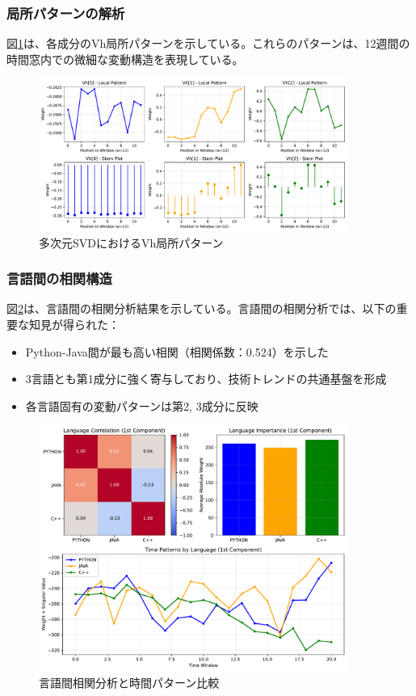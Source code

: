 \documentclass[a4paper,11pt]{jsarticle}
\begin{document}
\subsubsection{局所パターンの解析}

図\ref{fig:multilang-vh-patterns}は、各成分のVh局所パターンを示している。これらのパターンは、12週間の時間窓内での微細な変動構造を表現している。

\begin{figure}[H]
\centering
\includegraphics[width=0.9\textwidth]{figures/fig9_multilang_vh_patterns.pdf}
\caption{多次元SVDにおけるVh局所パターン}
\label{fig:multilang-vh-patterns}
\end{figure}

\subsubsection{言語間の相関構造}

図\ref{fig:multilang-correlation}は、言語間の相関分析結果を示している。言語間の相関分析では、以下の重要な知見が得られた：

\begin{itemize}
  \item Python-Java間が最も高い相関（相関係数：0.524）を示した
  \item 3言語とも第1成分に強く寄与しており、技術トレンドの共通基盤を形成
  \item 各言語固有の変動パターンは第2, 3成分に反映
\end{itemize}

\begin{figure}[H]
\centering
\includegraphics[width=0.9\textwidth]{figures/fig10_multilang_correlation.pdf}
\caption{言語間相関分析と時間パターン比較}
\label{fig:multilang-correlation}
\end{figure}
\end{document}
